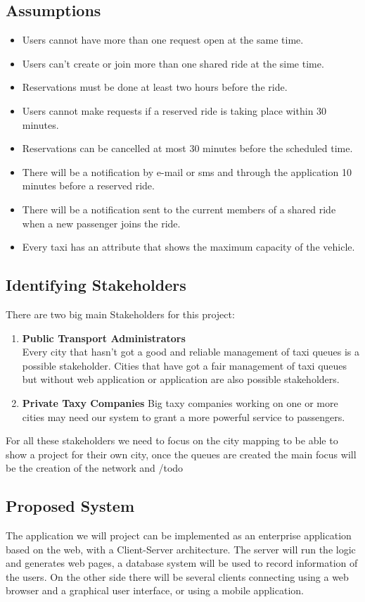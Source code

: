 \subsection{Assumptions}
\begin{itemize}
	\item Users cannot have more than one request open at the same time.
	\item Users can't create or join more than one shared ride at the sime time.
	\item Reservations must be done at least two hours before the ride.
	\item Users cannot make requests if a reserved ride is taking place within 30 minutes.
	\item Reservations can be cancelled at most 30 minutes before the scheduled time.
	\item There will be a notification by e-mail or sms and through the application 10 minutes before a reserved ride.
	\item There will be a notification sent to  the current members of a shared ride when a new passenger joins the ride.
	\item Every taxi has an attribute that shows the maximum capacity of the vehicle.
\end{itemize}

\subsection{Identifying Stakeholders}

There are two big main Stakeholders for this project:
\begin{enumerate}
	\item \textbf{Public Transport Administrators} \\
	Every city that hasn't got a good and reliable management of taxi queues is a possible stakeholder.  Cities that have got a fair management of taxi queues but without web application or application are also possible stakeholders.
	\item \textbf{Private Taxy Companies} 
	Big taxy companies working on one or more cities may need our system to grant a more powerful service to passengers.
\end{enumerate}
For all these stakeholders we need to focus on the city mapping to be able to show a project for their own city, once the queues are created the main focus will be the creation of the network and 
/todo 

\subsection{Proposed System}
The application we will project can be implemented as an enterprise application based on the web, with a Client-Server architecture. The server will run the logic and generates web pages, a database system will be used to record information of the users. On the other side there will be several clients connecting using a web browser and a graphical user interface, or using a mobile application.	
